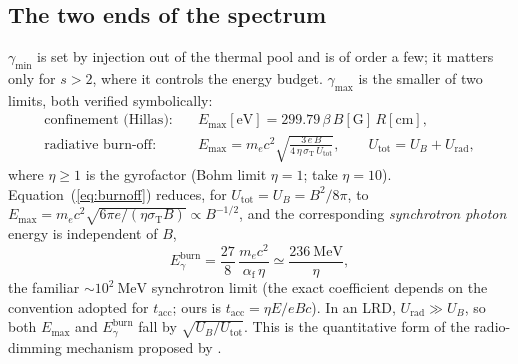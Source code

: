 \documentclass[11pt,a4paper]{article}
\begin{document}
\subsection{The two ends of the spectrum}
$\gamma_{\min}$ is set by injection out of the thermal pool and is of order a
few; it matters only for $s>2$, where it controls the energy budget.
$\gamma_{\max}$ is the smaller of two limits, both verified symbolically:
\begin{align}
  \text{confinement (Hillas):}\quad
  &E_{\max}[\mathrm{eV}] = 299.79\,\beta\,B[\mathrm{G}]\,R[\mathrm{cm}],
  \label{eq:hillas}\\[2pt]
  \text{radiative burn-off:}\quad
  &E_{\max}=m_ec^{2}\sqrt{\frac{3\,e\,B}{4\,\eta\,\sigma_{\mathrm T}\,U_{\mathrm{tot}}}},
  \qquad U_{\mathrm{tot}}=U_B+U_{\mathrm{rad}},
  \label{eq:burnoff}
\end{align}
where $\eta\ge1$ is the gyrofactor (Bohm limit $\eta=1$;
\citealt{Kuze2026} take $\eta=10$). Equation~(\ref{eq:burnoff}) reduces, for
$U_{\mathrm{tot}}=U_B=B^{2}/8\pi$, to
$E_{\max}=m_ec^{2}\sqrt{6\pi e/(\eta\sigma_{\mathrm T}B)}\propto B^{-1/2}$, and
the corresponding \emph{synchrotron photon} energy is independent of $B$,
\begin{equation}
  E_\gamma^{\mathrm{burn}}=\frac{27}{8}\,\frac{m_ec^{2}}{\alpha_{\mathrm f}\,\eta}
  \simeq\frac{236\ \mathrm{MeV}}{\eta},
  \label{eq:burnphot}
\end{equation}
the familiar $\sim\!10^{2}\ \mathrm{MeV}$ synchrotron limit (the exact
coefficient depends on the convention adopted for $t_{\mathrm{acc}}$; ours is
$t_{\mathrm{acc}}=\eta E/eBc$). In an LRD, $U_{\mathrm{rad}}\gg U_B$, so
both $E_{\max}$ and $E_\gamma^{\mathrm{burn}}$ fall by
$\sqrt{U_B/U_{\mathrm{tot}}}$. This is the quantitative form of the
radio-dimming mechanism proposed by \citet{Rodriguez2026}.
\end{document}
